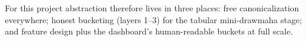 For this project abstraction therefore lives in three places: free canonicalization everywhere; honest bucketing (layers 1--3) for the tabular mini-drawmaha stage; and feature design plus the dashboard's human-readable buckets at full scale.

